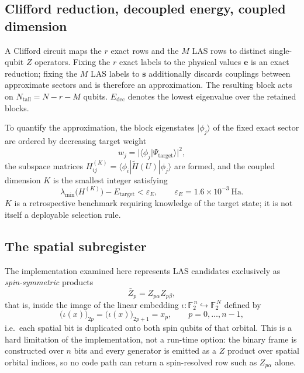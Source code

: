 \documentclass[11pt]{article}
\newcommand{\Ht}{\widetilde H}
\newcommand{\FF}{\mathbb F_2}
\newcommand{\Zb}{\bar Z}
\newcommand{\Edec}{E_{\mathrm{dec}}}
\begin{document}
\subsection{Clifford reduction, decoupled energy, coupled dimension}

A Clifford circuit maps the $r$ exact rows and the $M$ LAS rows to distinct
single-qubit $Z$ operators. Fixing the $r$ exact labels to the physical values
$\boldsymbol e$ is an exact reduction; fixing the $M$ LAS labels to
$\boldsymbol s$ additionally discards couplings between approximate sectors and
is therefore an approximation. The resulting block acts on
$N_{\mathrm{tail}}=N-r-M$ qubits. $\Edec$ denotes the lowest eigenvalue over
the retained blocks.

To quantify the approximation, the block eigenstates $|\phi_j\rangle$ of the
fixed exact sector are ordered by decreasing target weight
\begin{equation}
w_j=\bigl|\langle\phi_j|\Psi_{\mathrm{target}}\rangle\bigr|^{2},
\label{eq:wj}
\end{equation}
the subspace matrices $H^{(K)}_{ij}=\langle\phi_i|\Ht(U)|\phi_j\rangle$ are
formed, and the coupled dimension $K$ is the smallest integer satisfying
\begin{equation}
\lambda_{\min}\bigl(H^{(K)}\bigr)-E_{\mathrm{target}}<\varepsilon_E,
\qquad \varepsilon_E=1.6\times10^{-3}\ \mathrm{Ha}.
\label{eq:K}
\end{equation}
$K$ is a retrospective benchmark requiring knowledge of the target state; it is
not itself a deployable selection rule.

\subsection{The spatial subregister}
\label{sec:subregister}

The implementation examined here represents LAS candidates exclusively as
\emph{spin-symmetric} products
\begin{equation}
\Zb_p=Z_{p\alpha}Z_{p\beta},
\end{equation}
that is, inside the image of the linear embedding
$\iota:\FF^{\,n}\hookrightarrow\FF^{\,N}$ defined by
\begin{equation}
\bigl(\iota(x)\bigr)_{2p}=\bigl(\iota(x)\bigr)_{2p+1}=x_p,
\qquad p=0,\dots,n-1,
\label{eq:iota}
\end{equation}
i.e.\ each spatial bit is duplicated onto both spin qubits of that orbital.
This is a hard limitation of the implementation, not a run-time option: the
binary frame is constructed over $n$ bits and every generator is emitted as a
$Z$ product over spatial orbital indices, so no code path can return a
spin-resolved row such as $Z_{p\alpha}$ alone.
\end{document}
